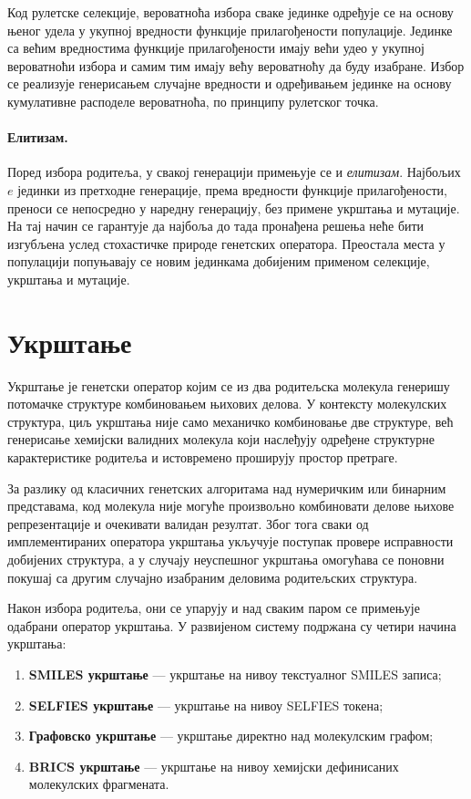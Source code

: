 \documentclass[12pt,oneside]{memoir}
\begin{document}
Код рулетске селекције, вероватноћа избора сваке јединке одређује се на 
основу њеног удела у укупној вредности функције прилагођености популације. 
Јединке са већим вредностима функције прилагођености имају већи удео у
укупној вероватноћи избора и самим тим имају већу вероватноћу да буду изабране. 
Избор се реализује генерисањем случајне вредности и одређивањем јединке на 
основу кумулативне расподеле вероватноћа, по принципу рулетског точка. 

\paragraph{Елитизам.}

Поред избора родитеља, у свакој генерацији примењује се и \textit{елитизам}. 
Најбољих $e$ јединки из претходне генерације, према вредности функције 
прилагођености, преноси се непосредно у наредну генерацију, без примене 
укрштања и мутације. На тај начин се гарантује да најбоља до тада пронађена 
решења неће бити изгубљена услед стохастичке природе генетских оператора. 
Преостала места у популацији попуњавају се новим јединкама добијеним 
применом селекције, укрштања и мутације.

\section{Укрштање}
\label{chp:crossover}

Укрштање је генетски оператор којим се из два родитељска молекула генеришу 
потомачке структуре комбиновањем њихових делова. У контексту молекулских 
структура, циљ укрштања није само механичко комбиновање две структуре, већ 
генерисање хемијски валидних молекула који наслеђују одређене структурне 
карактеристике родитеља и истовремено проширују простор претраге.

За разлику од класичних генетских алгоритама над нумеричким или бинарним 
представама, код молекула није могуће произвољно комбиновати делове њихове 
репрезентације и очекивати валидан резултат. Због тога сваки од имплементираних 
оператора укрштања укључује поступак провере исправности добијених структура, а у случају 
неуспешног укрштања омогућава се поновни покушај са другим случајно изабраним 
деловима родитељских структура.

Након избора родитеља, они се упарују и над сваким паром се примењује одабрани 
оператор укрштања. У развијеном систему подржана су 
четири начина укрштања:

\begin{enumerate}
\item \textbf{SMILES укрштање} — укрштање на нивоу текстуалног SMILES записа;
\item \textbf{SELFIES укрштање} — укрштање на нивоу SELFIES токена;
\item \textbf{Графовско укрштање} — укрштање директно над молекулским графом;
\item \textbf{BRICS укрштање} — укрштање на нивоу хемијски дефинисаних молекулских фрагмената.
\end{enumerate}
\end{document}
